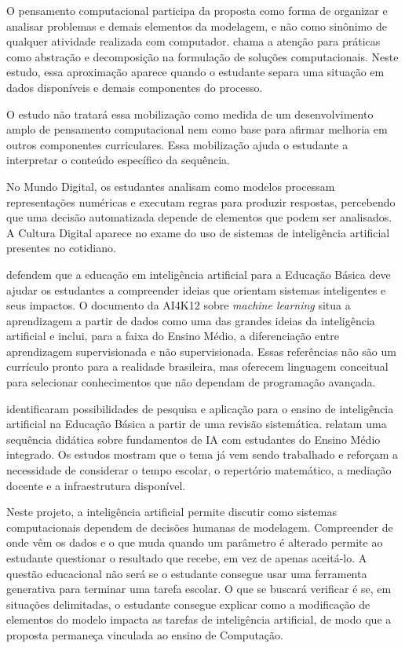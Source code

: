O pensamento computacional participa da proposta como forma de organizar e analisar problemas e demais elementos da modelagem, e não como sinônimo de qualquer atividade realizada com computador.  chama a atenção para práticas como abstração e decomposição na formulação de soluções computacionais. Neste estudo, essa aproximação aparece quando o estudante separa uma situação em dados disponíveis e demais componentes do processo.

O estudo não tratará essa mobilização como medida de um desenvolvimento amplo de pensamento computacional nem como base para afirmar melhoria em outros componentes curriculares. Essa mobilização ajuda o estudante a interpretar o conteúdo específico da sequência.

No Mundo Digital, os estudantes analisam como modelos processam representações numéricas e executam regras para produzir respostas, percebendo que uma decisão automatizada depende de elementos que podem ser analisados. A Cultura Digital aparece no exame do uso de sistemas de inteligência artificial presentes no cotidiano.

 defendem que a educação em inteligência artificial para a Educação Básica deve ajudar os estudantes a compreender ideias que orientam sistemas inteligentes e seus impactos. O documento da AI4K12 sobre \textit{machine learning} \cite{touretzky2023machine} situa a aprendizagem a partir de dados como uma das grandes ideias da inteligência artificial e inclui, para a faixa do Ensino Médio, a diferenciação entre aprendizagem supervisionada e não supervisionada. Essas referências não são um currículo pronto para a realidade brasileira, mas oferecem linguagem conceitual para selecionar conhecimentos que não dependam de programação avançada.

 identificaram possibilidades de pesquisa e aplicação para o ensino de inteligência artificial na Educação Básica a partir de uma revisão sistemática.  relatam uma sequência didática sobre fundamentos de IA com estudantes do Ensino Médio integrado. Os estudos mostram que o tema já vem sendo trabalhado e reforçam a necessidade de considerar o tempo escolar, o repertório matemático, a mediação docente e a infraestrutura disponível.

Neste projeto, a inteligência artificial permite discutir como sistemas computacionais dependem de decisões humanas de modelagem. Compreender de onde vêm os dados e o que muda quando um parâmetro é alterado permite ao estudante questionar o resultado que recebe, em vez de apenas aceitá-lo. A questão educacional não será se o estudante consegue usar uma ferramenta generativa para terminar uma tarefa escolar. O que se buscará verificar é se, em situações delimitadas, o estudante consegue explicar como a modificação de elementos do modelo impacta as tarefas de inteligência artificial, de modo que a proposta permaneça vinculada ao ensino de Computação.

